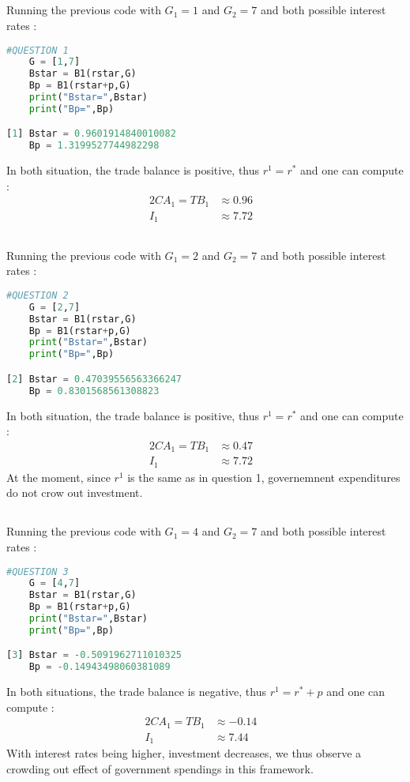 \documentclass{article}
\begin{document}
\subsection{}
Running the previous code with $G_1 = 1$ and $G_2 = 7$ and both possible interest rates :
\begin{lstlisting}[language=Python, label=python_code]
    #QUESTION 1
    G = [1,7]
    Bstar = B1(rstar,G)
    Bp = B1(rstar+p,G)
    print("Bstar=",Bstar)
    print("Bp=",Bp)

[1] Bstar = 0.9601914840010082
    Bp = 1.3199527744982298
\end{lstlisting}
In both situation, the trade balance is positive, thus $r^1 = r^*$ and one can compute :
\begin{alignat}{2}
    CA_1  = TB_1 &\approx 0.96&\\
    I_1 &\approx 7.72
\end{alignat}
\subsection{}
Running the previous code with $G_1 = 2$ and $G_2 = 7$ and both possible interest rates :
\begin{lstlisting}[language=Python, label=python_code]
    #QUESTION 2
    G = [2,7]
    Bstar = B1(rstar,G)
    Bp = B1(rstar+p,G)
    print("Bstar=",Bstar)
    print("Bp=",Bp)

[2] Bstar = 0.47039556563366247
    Bp = 0.8301568561308823
\end{lstlisting}
In both situation, the trade balance is positive, thus $r^1 = r^*$ and one can compute :
\begin{alignat}{2}
    CA_1  = TB_1 &\approx 0.47&\\
    I_1 &\approx 7.72
\end{alignat}
At the moment, since $r^1$ is the same as in question 1, governemnent expenditures do not crow out investment.
\subsection{}
Running the previous code with $G_1 = 4$ and $G_2 = 7$ and both possible interest rates :
\begin{lstlisting}[language=Python, label=python_code]
    #QUESTION 3
    G = [4,7]
    Bstar = B1(rstar,G)
    Bp = B1(rstar+p,G)
    print("Bstar=",Bstar)
    print("Bp=",Bp)

[3] Bstar = -0.5091962711010325
    Bp = -0.14943498060381089
\end{lstlisting}
In both situations, the trade balance is negative, thus $r^1 = r^* + p$ and one can compute :
\begin{alignat}{2}
    CA_1  = TB_1 &\approx -0.14&\\
    I_1 &\approx 7.44
\end{alignat}
With interest rates being higher, investment decreases, we thus observe a crowding out effect of government spendings in this framework.
\end{document}
